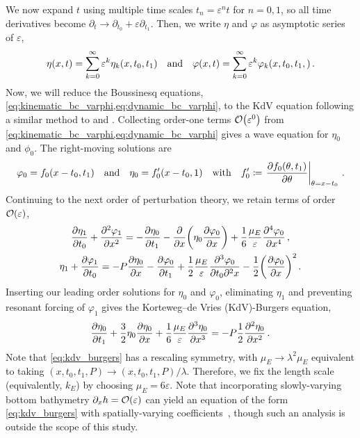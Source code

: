\documentclass{jfm}
\renewcommand*{\epsilon}{\varepsilon}
\begin{document}
We now expand $t$ using multiple time scales $t_n =
\epsilon^n t$ for $n= 0,1$, so all time derivatives become $\partial_t \to
\partial_{t_0} + \epsilon \partial_{t_1}$.
Then, we write $\eta$ and $\varphi$ as asymptotic series of $\epsilon$,
\begin{equation}
  \eta(x,t) = \sum_{k=0}^{\infty} \epsilon^k
    \eta_{k}(x,t_0,t_1) \qq{and}
  \varphi(x,t) = \sum_{k=0}^{\infty} \epsilon^k
    \varphi_{k}(x,t_0,t_1,) \,.
\end{equation}
Now, we will reduce the Boussinesq equations,
\cref{eq:kinematic_bc_varphi,eq:dynamic_bc_varphi}, to the KdV equation
following a similar method to \citet{mei2005nonlinear} and
\citet{ablowitz2011nonlinear}.
Collecting order-one terms $\order{\epsilon^0}$ from
\cref{eq:kinematic_bc_varphi,eq:dynamic_bc_varphi} gives
a wave equation for $\eta_0$ and $\phi_0$.
The right-moving solutions are
\begin{equation}
  \varphi_0 = f_0(x-t_0,t_1) \qq{and}
  \eta_0 = f'_0(x-t_0,1) \qq{with}
  f_0' \coloneqq \eval{\pdv{f_0(\theta,t_1)}{\theta}}_{\theta = x-t_0} \,.
\end{equation}
Continuing to the next order of perturbation theory, we retain terms of
order $\order{\epsilon}$,
\begin{gather}
    \pdv{\eta_1}{t_0} + \pdv[2]{\varphi_{1}}{x} =
      -\pdv{\eta_0}{t_1} - \pdv{x} \pqty{\eta_0 \pdv{\varphi_0}{x}} +
      \frac{1}{6} \frac{\mu_E}{\epsilon} \pdv[4]{\varphi_0}{x} \,,
  \\
    \eta_1 + \pdv{\varphi_1}{t_0} = -P \pdv{\eta_0}{x} -\pdv{\varphi_0}{t_1}
      + \frac{1}{2} \frac{\mu_E}{\epsilon} \frac{\partial^3 \varphi_0}
        {\partial t_0 \partial^2 x}
      - \frac{1}{2} \pqty{ \pdv{\varphi_0}{x} }^2
  \,.
\end{gather}
Inserting our leading order solutions for $\eta_0$ and $\varphi_0$,
eliminating $\eta_1$ and preventing resonant forcing of $\varphi_1$
gives the Korteweg--de Vries (KdV)-Burgers equation,
\begin{equation}
  \pdv{\eta_0}{t_1} + \frac{3}{2}
    \eta_0 \pdv{\eta_0}{x} + \frac{1}{6} \frac{\mu_E}{\epsilon}
    \pdv[3]{\eta_0}{x} = -P \frac{1}{2} \pdv[2]{\eta_0}{x} \,.
  \label{eq:kdv_burgers}
\end{equation}
Note that \cref{eq:kdv_burgers} has a rescaling symmetry, with $\mu_E
\to \lambda^2 \mu_E$ equivalent to taking $(x,t_0,t_1,P) \to
(x,t_0,t_1,P)/\lambda$.
Therefore, we fix the length scale (equivalently, $k_E$) by choosing
$\mu_E = 6 \epsilon$.
Note that incorporating slowly-varying bottom bathymetry $\partial_x h =
\order{\epsilon}$ can yield an equation of the form
\cref{eq:kdv_burgers} with spatially-varying
coefficients~\citep[\eg][]{johnson1972some,ono1972wave}, though such an
analysis is outside the scope of this study.
\end{document}
